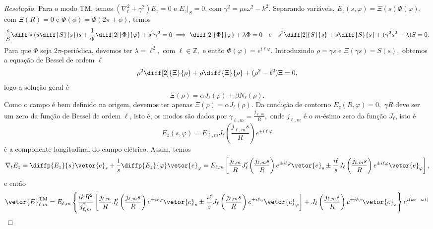 \begin{proof}[Resolução]
    Para o modo TM, temos \((\nabla_t^2 + \gamma^2)E_z = 0\) e \(\left.E_z\right|_S = 0\), com \(\gamma^2 = \mu \epsilon \omega^2 - k^2\). Separando variáveis, \(E_z(s, \varphi) = \Xi(s) \Phi(\varphi),\) com \(\Xi(R) = 0\) e \(\Phi(\phi) = \Phi(2\pi + \phi)\), temos
    \begin{equation*}
        \frac{s}{S} \diff*{\left(s \diff{S}{s}\right)}{s} + \frac{1}{\Phi} \diff[2]{\Phi}{\varphi} + s^2\gamma^2 = 0 \implies
        \diff[2]{\Phi}{\varphi} + \lambda \Phi = 0\quad\text{e}\quad s^2 \diff[2]{S}{s} + s \diff{S}{s} + (\gamma^2 s^2 - \lambda) S = 0.
    \end{equation*}
    Para que \(\Phi\) seja \(2\pi\)-periódica, devemos ter \(\lambda = \ell^2,\) com \(\ell \in \mathbb{Z},\) e então \(\Phi(\varphi) = e^{i\ell \varphi}.\) Introduzindo \(\rho = \gamma s\) e \(\Xi(\gamma s) = S(s),\) obtemos a equação de Bessel de ordem \(\ell\)
    \begin{equation*}
        \rho^2 \diff[2]{\Xi}{\rho} + \rho \diff{\Xi}{\rho} + (\rho^2 - \ell^2) \Xi = 0,
    \end{equation*}
    logo a solução geral é 
    \begin{equation*}
        \Xi(\rho) = \alpha J_\ell(\rho) + \beta N_\ell(\rho).
    \end{equation*}
    Como o campo é bem definido na origem, devemos ter apenas \(\Xi(\rho) = \alpha J_\ell(\rho)\).
    Da condição de contorno \(E_z(R, \varphi) = 0,\) \(\gamma R\) deve ser um zero da função de Bessel de ordem \(\ell\), isto é, os modos são dados por \(\gamma_{\ell, m} = \frac{j_{\ell,m}}{R},\) onde \(j_{\ell,m}\) é o \(m\)-ésimo zero da função \(J_\ell\), isto é
    \begin{equation*}
        E_z(s, \varphi) = E_{\ell,m}J_\ell\left(\frac{j_{\ell, m} s}{R}\right) e^{\pm i \ell \varphi}
    \end{equation*}
    é a componente longitudinal do campo elétrico. Assim, temos
    \begin{equation*}
        \nabla_t E_z = \diffp{E_z}{s} \vetor{e}_s + \frac{1}{s}\diffp{E_z}{\varphi} \vetor{e}_\varphi = E_{\ell, m}\left[\frac{j_{\ell, m}}{R} J_\ell'\left(\frac{j_{\ell,m} s}{R}\right)e^{\pm i \ell \varphi} \vetor{e}_s \pm \frac{i \ell}{s} J_\ell\left(\frac{j_{\ell,m} s}{R}\right)e^{\pm i \ell \varphi}\vetor{e}_\varphi\right],
    \end{equation*}
    e então
    \begin{equation*}
        \vetor{E}^{\mathrm{TM}}_{\ell,m} = E_{\ell, m}\left\{\frac{i kR^2}{j_{\ell, m}^2}\left[\frac{j_{\ell, m}}{R} J_\ell'\left(\frac{j_{\ell,m} s}{R}\right)e^{\pm i \ell \varphi} \vetor{e}_s \pm \frac{i \ell}{s} J_\ell\left(\frac{j_{\ell,m} s}{R}\right)e^{\pm i \ell \varphi}\vetor{e}_\varphi\right] + J_\ell\left(\frac{j_{\ell, m} s}{R}\right) e^{\pm i \ell \varphi}\vetor{e}_z\right\}e^{i(kz - \omega t)}

\end{equation*}
\end{proof}
